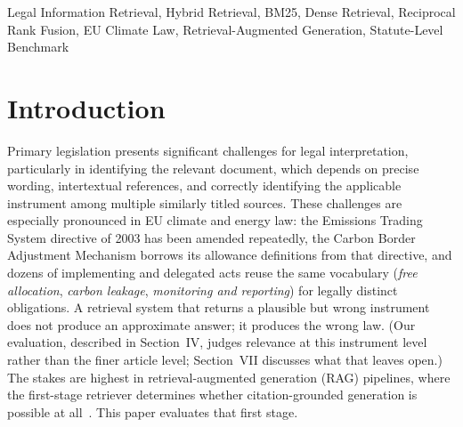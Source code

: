 \documentclass[conference,a4paper]{IEEEtran}
\begin{document}
\begin{abstract}
systems, though SPLADE's point estimates are close behind and the
hybrid's improvement over dense alone is not significant
($p{=}0.614$); only 5 of 53 queries ($9.4\,\%$) are hard failures for
the hybrid.
An embedding-model ablation adds a null result: E5-large-v2 and
BGE-small-v1.5, both restricted to 512-token windows that truncate a
fifth of this corpus, show no significant difference from the
8{,}192-token encoder (Wilcoxon $p{\geq}0.055$), and a targeted check
finds the document-chunking strategy makes no measurable difference
either (Section~V-G).
The transferable finding is methodological: on a leakage-controlled
benchmark a strong general-domain dense retriever already performs
close to the best point estimate any system reaches on this corpus,
and weighted lexical-semantic fusion adds modest ranking gains
without a statistically significant coverage improvement, so we argue
leakage control and externally sourced information needs should be
standard practice when benchmarking statute-level retrieval.
\end{abstract}

\begin{IEEEkeywords}
Legal Information Retrieval, Hybrid Retrieval, BM25,
Dense Retrieval, Reciprocal Rank Fusion, EU Climate Law,
Retrieval-Augmented Generation, Statute-Level Benchmark
\end{IEEEkeywords}

\IEEEpeerreviewmaketitle

\section{Introduction}

Primary legislation presents significant challenges for legal
interpretation, particularly in identifying the relevant document,
which depends on precise wording, intertextual references, and
correctly identifying the applicable instrument among multiple
similarly titled sources.
These challenges are especially pronounced in EU climate and energy
law: the Emissions Trading System directive of 2003 has been amended
repeatedly, the Carbon Border Adjustment Mechanism borrows its
allowance definitions from that directive, and dozens of implementing
and delegated acts reuse the same vocabulary (\textit{free
allocation}, \textit{carbon leakage}, \textit{monitoring and
reporting}) for legally distinct obligations.
A retrieval system that returns a plausible but wrong instrument does
not produce an approximate answer; it produces the wrong law.
(Our evaluation, described in Section~IV, judges relevance at this
instrument level rather than the finer article level; Section~VII
discusses what that leaves open.)
The stakes are highest in retrieval-augmented generation (RAG)
pipelines, where the first-stage retriever determines whether
citation-grounded generation is possible at all~\cite{13}.
This paper evaluates that first stage.
\end{document}
